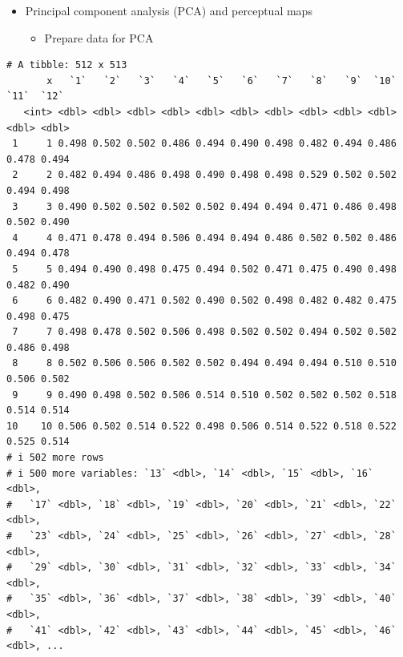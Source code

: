 \documentclass[
  ignorenonframetext,
]{beamer}
\providecommand{\tightlist}{%
  \setlength{\itemsep}{0pt}\setlength{\parskip}{0pt}}\usepackage{longtable,booktabs,array}
\begin{document}
\begin{frame}[fragile]{}
\label{section-26}
\begin{itemize}
\item
  Principal component analysis (PCA) and perceptual maps

  \begin{itemize}
  \tightlist
  \item
    Prepare data for PCA
  \end{itemize}
\end{itemize}

\tiny

\begin{verbatim}
# A tibble: 512 x 513
       x   `1`   `2`   `3`   `4`   `5`   `6`   `7`   `8`   `9`  `10`  `11`  `12`
   <int> <dbl> <dbl> <dbl> <dbl> <dbl> <dbl> <dbl> <dbl> <dbl> <dbl> <dbl> <dbl>
 1     1 0.498 0.502 0.502 0.486 0.494 0.490 0.498 0.482 0.494 0.486 0.478 0.494
 2     2 0.482 0.494 0.486 0.498 0.490 0.498 0.498 0.529 0.502 0.502 0.494 0.498
 3     3 0.490 0.502 0.502 0.502 0.502 0.494 0.494 0.471 0.486 0.498 0.502 0.490
 4     4 0.471 0.478 0.494 0.506 0.494 0.494 0.486 0.502 0.502 0.486 0.494 0.478
 5     5 0.494 0.490 0.498 0.475 0.494 0.502 0.471 0.475 0.490 0.498 0.482 0.490
 6     6 0.482 0.490 0.471 0.502 0.490 0.502 0.498 0.482 0.482 0.475 0.498 0.475
 7     7 0.498 0.478 0.502 0.506 0.498 0.502 0.502 0.494 0.502 0.502 0.486 0.498
 8     8 0.502 0.506 0.506 0.502 0.502 0.494 0.494 0.494 0.510 0.510 0.506 0.502
 9     9 0.490 0.498 0.502 0.506 0.514 0.510 0.502 0.502 0.502 0.518 0.514 0.514
10    10 0.506 0.502 0.514 0.522 0.498 0.506 0.514 0.522 0.518 0.522 0.525 0.514
# i 502 more rows
# i 500 more variables: `13` <dbl>, `14` <dbl>, `15` <dbl>, `16` <dbl>,
#   `17` <dbl>, `18` <dbl>, `19` <dbl>, `20` <dbl>, `21` <dbl>, `22` <dbl>,
#   `23` <dbl>, `24` <dbl>, `25` <dbl>, `26` <dbl>, `27` <dbl>, `28` <dbl>,
#   `29` <dbl>, `30` <dbl>, `31` <dbl>, `32` <dbl>, `33` <dbl>, `34` <dbl>,
#   `35` <dbl>, `36` <dbl>, `37` <dbl>, `38` <dbl>, `39` <dbl>, `40` <dbl>,
#   `41` <dbl>, `42` <dbl>, `43` <dbl>, `44` <dbl>, `45` <dbl>, `46` <dbl>, ...
\end{verbatim}
\end{frame}
\end{document}
